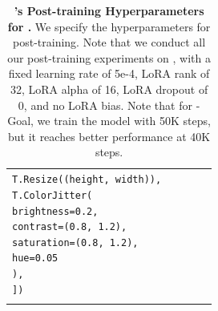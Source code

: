 \begin{table}[!htbp]
\begin{tabular}{l*{4}{>{\centering\arraybackslash}p{2.3cm}}}
{{\texttt{\hspace*{1em}T.Resize((height, width)),}\\
\texttt{\hspace*{1em}T.ColorJitter(}\\
\texttt{\hspace*{2em}brightness=0.2,}\\
\texttt{\hspace*{2em}contrast=(0.8, 1.2),}\\
\texttt{\hspace*{2em}saturation=(0.8, 1.2),}\\
\texttt{\hspace*{2em}hue=0.05}\\
\texttt{\hspace*{1em}),}\\
\texttt{])}
}} \\
\addlinespace[4pt]  
\bottomrule
\end{tabular}
\caption{\textbf{\molmoact's Post-training Hyperparameters for \libero.} We specify the hyperparameters for \molmoact post-training. Note that we conduct all our post-training experiments on \molmoactd, with a fixed learning rate of 5e-4, LoRA rank of 32, LoRA alpha of 16, LoRA dropout of 0, and no LoRA bias. Note that for \libero-Goal, we train the model with 50K steps, but it reaches better performance at 40K steps.}
\label{tab:hyperparams_libero}
\end{table}